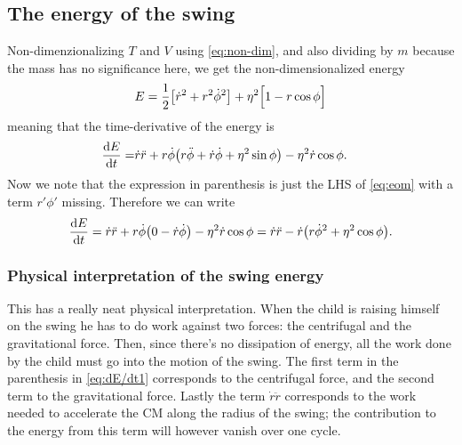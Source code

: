 \subsection{The energy of the swing}
Non-dimenzionalizing $T$ and $V$ using \eqref{eq:non-dim}, %
and also dividing by $m$ because the mass has no significance here, we
get the non-dimensionalized energy  
\begin{equation}\label{eq:E}
E=\frac{1}{2}\qty[\dot{r}^2 + {r}^2\dot{\phi}^2] 
+\eta^2\Big[1-r\cos\phi\Big] 
\end{equation}
meaning that the time-derivative of the energy is
\begin{equation}
\begin{aligned}
\dv{E}{t}
=&\dot{r}\ddot{r}+r\dot\phi\qty(r\ddot\phi + \dot{r}\dot\phi + \eta^2\sin\phi) 
-\eta^2\dot{r}\cos\phi.
\end{aligned}
\end{equation}
Now we note that the expression in parenthesis is just the LHS of
\eqref{eq:eom} with a term $r'\phi'$ missing. Therefore we can write
\begin{equation}\label{eq:dE/dt1}
\dv{E}{t}
=\dot{r}\ddot{r}+r\dot\phi\qty(0-\dot{r}\dot\phi)-\eta^2\dot{r}\cos\phi
=\dot{r}\ddot{r} - \dot{r}\qty(r\dot{\phi}^2 + \eta^2\cos\phi).
\end{equation}





\subsubsection{Physical interpretation of the swing energy}
\label{sec:phys_interp}
This has a really neat physical interpretation. When the child is
raising himself on the swing he has to do work against two forces:
the centrifugal and the gravitational force. Then, since there's no
dissipation of energy, all the work done by the child must go into the
motion of the swing. 
The first term in the parenthesis in \eqref{eq:dE/dt1} corresponds
to the centrifugal force, and the second term to the gravitational
force.
Lastly the term $\dot{r}\ddot{r}$ corresponds to the work needed to
accelerate the CM along the radius of the swing; the contribution to
the energy from this term will however vanish over one
cycle.\footnotemark{}   

